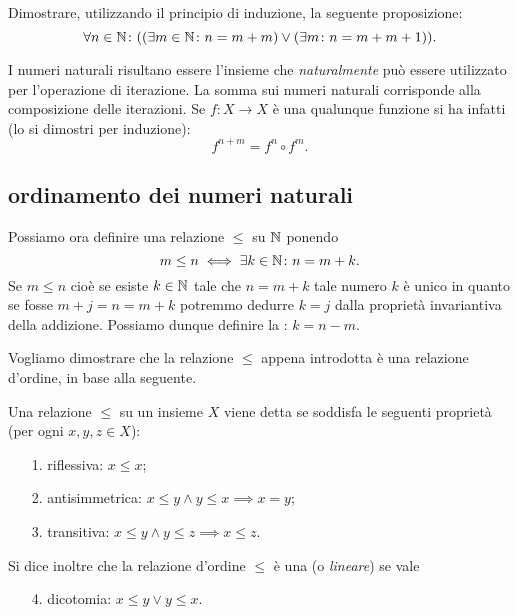 \begin{exercise}
  Dimostrare, utilizzando il principio di induzione, la seguente 
  proposizione:
  \[
  \forall n\in {\mathbb N}\colon {\left( {\left( \exists m\in {\mathbb N}\colon n = m + m \right)} 
  \lor {\left( \exists m\colon n = m + m + 1 \right)} \right)}.  
  \]
\end{exercise}

I numeri naturali risultano essere l'insieme che \emph{naturalmente} può 
essere utilizzato per l'operazione di iterazione. La somma sui numeri 
naturali corrisponde alla composizione delle iterazioni. Se 
$f\colon X\to X$ è una qualunque funzione si ha infatti (lo si dimostri per induzione):
\[
   f^{n+m} = f^n \circ f^m.
\]


\subsection{ordinamento dei numeri naturali}

Possiamo ora definire una relazione $\le$ su ${\mathbb N}$ ponendo 
\[
  m \le n \iff \exists k\in {\mathbb N}\colon n = m+k.  
\]
Se $m\le n$ cioè se esiste $k\in {\mathbb N}$ tale che $n=m+k$ tale numero 
$k$ è unico in quanto se fosse $m+j=n=m+k$ potremmo dedurre $k=j$
dalla proprietà invariantiva della addizione. 
Possiamo dunque definire la : $k=n-m$.


Vogliamo dimostrare che la relazione $\le$ appena introdotta 
è una relazione d'ordine, in base alla seguente.

\begin{definition}
  \label{def:ordine}%
  Una relazione
  $\le$ su un insieme $X$ viene detta
  se soddisfa le seguenti proprietà (per ogni $x,y,z\in X$):
  \begin{enumerate}
    \item[1.] riflessiva: $x\le x$;
    \item[2.] antisimmetrica: $x\le y \land y\le x \implies x=y$;
    \item[3.] transitiva: $x\le y \land y\le z \implies x\le z$.
  \end{enumerate}
  Si dice inoltre che la relazione d'ordine $\le$
  è una  (o \emph{lineare}) 
  se vale
  \begin{enumerate}
    \item[4.] dicotomia: $x\le y \lor y\le x$.
  \end{enumerate}
\end{definition}

